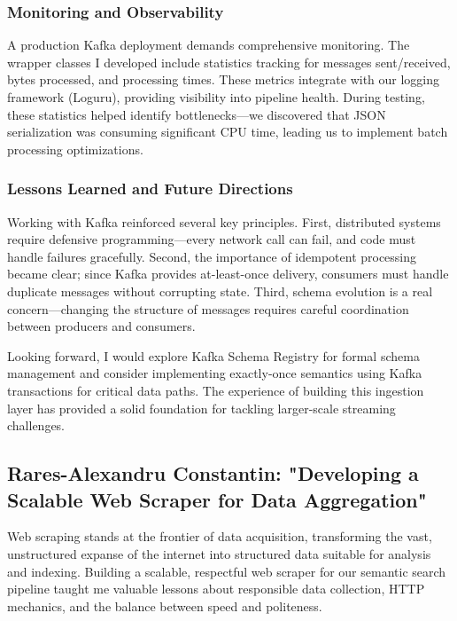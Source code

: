\documentclass[12pt, a4paper]{article}
\begin{document}
\subsubsection*{Monitoring and Observability}

A production Kafka deployment demands comprehensive monitoring. The wrapper classes I developed include statistics tracking for messages sent/received, bytes processed, and processing times. These metrics integrate with our logging framework (Loguru), providing visibility into pipeline health. During testing, these statistics helped identify bottlenecks—we discovered that JSON serialization was consuming significant CPU time, leading us to implement batch processing optimizations.

\subsubsection*{Lessons Learned and Future Directions}

Working with Kafka reinforced several key principles. First, distributed systems require defensive programming—every network call can fail, and code must handle failures gracefully. Second, the importance of idempotent processing became clear; since Kafka provides at-least-once delivery, consumers must handle duplicate messages without corrupting state. Third, schema evolution is a real concern—changing the structure of messages requires careful coordination between producers and consumers.

Looking forward, I would explore Kafka Schema Registry for formal schema management and consider implementing exactly-once semantics using Kafka transactions for critical data paths. The experience of building this ingestion layer has provided a solid foundation for tackling larger-scale streaming challenges.

\newpage
\subsection{Rares-Alexandru Constantin: "Developing a Scalable Web Scraper for Data Aggregation"}

Web scraping stands at the frontier of data acquisition, transforming the vast, unstructured expanse of the internet into structured data suitable for analysis and indexing. Building a scalable, respectful web scraper for our semantic search pipeline taught me valuable lessons about responsible data collection, HTTP mechanics, and the balance between speed and politeness.
\end{document}
